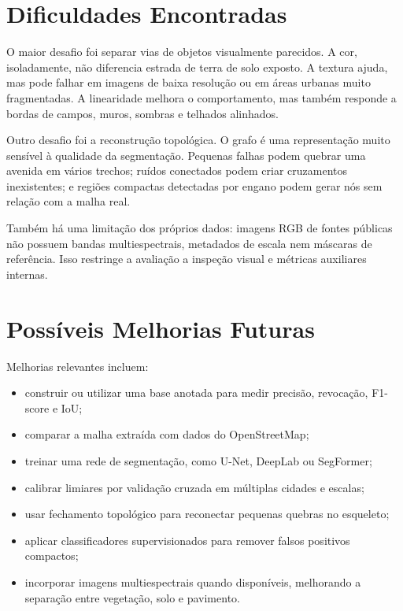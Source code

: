 \documentclass[12pt,a4paper]{article}
\begin{document}
\section{Dificuldades Encontradas}

O maior desafio foi separar vias de objetos visualmente parecidos. A cor, isoladamente, não diferencia estrada de terra de solo exposto. A textura ajuda, mas pode falhar em imagens de baixa resolução ou em áreas urbanas muito fragmentadas. A linearidade melhora o comportamento, mas também responde a bordas de campos, muros, sombras e telhados alinhados.

Outro desafio foi a reconstrução topológica. O grafo é uma representação muito sensível à qualidade da segmentação. Pequenas falhas podem quebrar uma avenida em vários trechos; ruídos conectados podem criar cruzamentos inexistentes; e regiões compactas detectadas por engano podem gerar nós sem relação com a malha real.

Também há uma limitação dos próprios dados: imagens RGB de fontes públicas não possuem bandas multiespectrais, metadados de escala nem máscaras de referência. Isso restringe a avaliação a inspeção visual e métricas auxiliares internas.

\section{Possíveis Melhorias Futuras}

Melhorias relevantes incluem:

\begin{itemize}
    \item construir ou utilizar uma base anotada para medir precisão, revocação, F1-score e IoU;
    \item comparar a malha extraída com dados do OpenStreetMap;
    \item treinar uma rede de segmentação, como U-Net, DeepLab ou SegFormer;
    \item calibrar limiares por validação cruzada em múltiplas cidades e escalas;
    \item usar fechamento topológico para reconectar pequenas quebras no esqueleto;
    \item aplicar classificadores supervisionados para remover falsos positivos compactos;
    \item incorporar imagens multiespectrais quando disponíveis, melhorando a separação entre vegetação, solo e pavimento.
\end{itemize}
\end{document}
